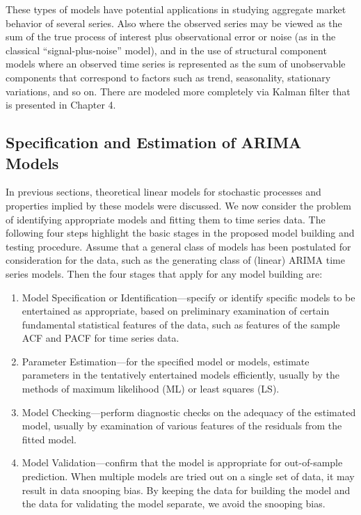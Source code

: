 These types of models have potential applications in studying aggregate market behavior of several series. Also where the observed series may be viewed as the sum of the true process of interest plus observational error or noise (as in the classical ``signal-plus-noise'' model), and in the use of structural component models where an observed time series is represented as the sum of unobservable components that correspond to factors such as trend, seasonality, stationary variations, and so on. There are modeled more completely via Kalman filter that is presented in Chapter 4. 


\subsection{Specification and Estimation of ARIMA Models} \hfill


In previous sections, theoretical linear models for stochastic processes and properties implied by these models were discussed. We now consider the problem of identifying appropriate models and fitting them to time series data. The following four steps highlight the basic stages in the proposed model building and testing procedure. Assume that a general class of models has been postulated for consideration for the data, such as the generating class of (linear) ARIMA time series models. Then the four stages that apply for any model building are: 
\begin{enumerate}
\item Model Specification or Identification---specify or identify specific models to be entertained as appropriate, based on preliminary examination of certain fundamental statistical features of the data, such as features of the sample ACF and PACF for time series data.

\item Parameter Estimation---for the specified model or models, estimate parameters in the tentatively entertained models efficiently, usually by the methods of maximum likelihood (ML) or least squares (LS).

\item Model Checking---perform diagnostic checks on the adequacy of the estimated model, usually by examination of various features of the residuals from the fitted model.

\item Model Validation---confirm that the model is appropriate for out-of-sample prediction. When multiple models are tried out on a single set of data, it may result in data snooping bias. By keeping the data for building the model and the data for validating the model separate, we avoid the snooping bias.
\end{enumerate}

